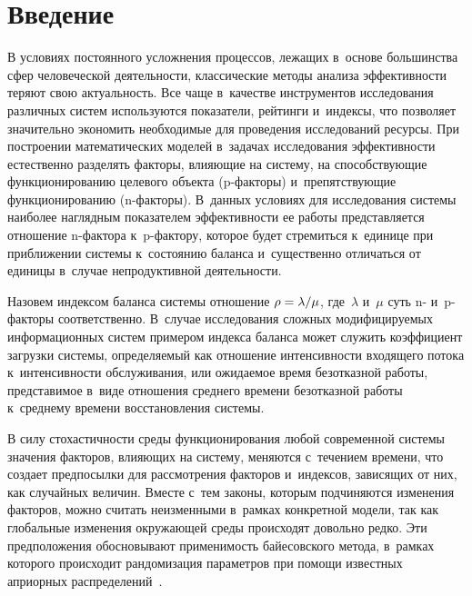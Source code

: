 
  



\thispagestyle{headings}

\begin{multicols}{2}

\label{st\stat}

\section{Введение}

В условиях постоянного усложнения процессов, лежащих в~основе большинства сфер 
человеческой деятельности, классические методы анализа эффективности теряют свою 
актуальность. Все чаще в~качестве инструментов исследования различных систем 
используются показатели, рейтинги и~индексы, что позволяет значительно экономить 
необходимые для проведения исследований ресурсы. При построении математических 
моделей в~задачах исследования эффективности естественно разделять факторы, 
влияющие на систему, на способствующие функционированию целевого объекта 
(p-фак\-то\-ры) и~препятствующие функционированию (n-фак\-то\-ры). 
В~данных условиях для 
исследования системы наиболее наглядным показателем эффективности ее работы 
представляется отношение n-фак\-то\-ра к~p-фак\-то\-ру, которое будет стремиться 
к~единице при приближении системы к~состоянию баланса и~существенно отличаться от 
единицы в~случае непродуктивной деятельности.

Назовем индексом баланса системы отношение $\rho \hm= \lambda/\mu$, где~$\lambda$ 
и~$\mu$ суть n- и~p-фак\-то\-ры соответственно. В~случае исследования сложных 
модифицируемых информационных сис\-тем примером индекса баланса может служить 
коэффициент загрузки сис\-те\-мы, опре\-де\-ля\-емый как отношение ин\-тен\-сив\-ности входящего 
потока к~интенсивности обслуживания, или ожидаемое время безотказной работы, 
представимое в~виде отношения среднего времени безотказной работы к~среднему 
времени вос\-ста\-нов\-ле\-ния системы.

В силу стохастичности среды функционирования любой современной системы значения 
факторов, влияющих на систему, меняются с~течением времени, что создает 
предпосылки для рассмотрения факторов и~индексов, зависящих от них, как 
случайных величин. Вместе с~тем законы, которым подчиняются изменения факторов, 
можно считать неизменными в~рамках конкретной модели, так как глобальные 
изменения окружающей среды происходят довольно редко. Эти предположения 
обосно\-вы\-ва\-ют применимость байесовского метода, в~рамках которого происходит 
рандомизация параметров при помощи известных априорных распределений~\cite{Ku18}.


\end{multicols}

